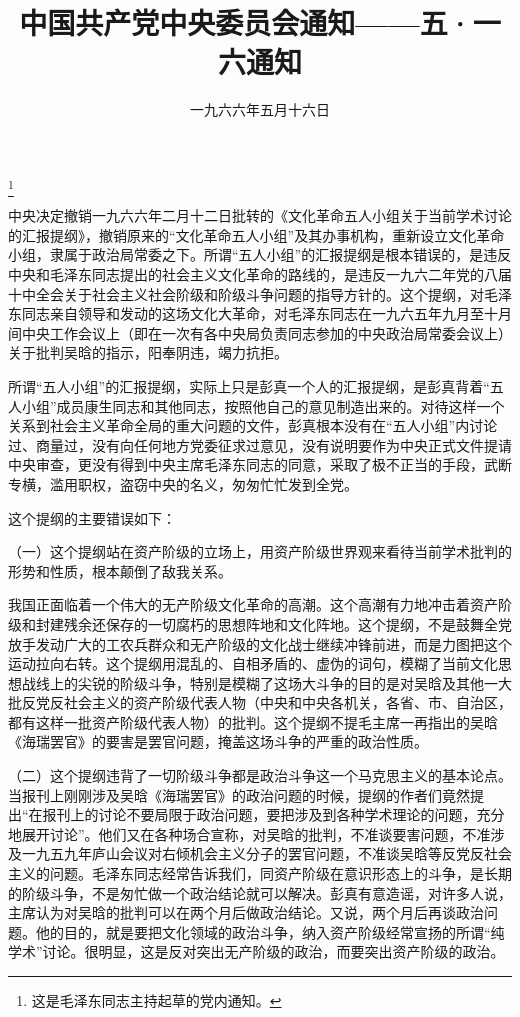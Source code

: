
\title{中国共产党中央委员会通知——五·一六通知}
\date{一九六六年五月十六日}
\thanks{这是毛泽东同志主持起草的党内通知。}
\maketitle



中央决定撤销一九六六年二月十二日批转的《文化革命五人小组关于当前学术讨论的汇报提纲》，撤销原来的“文化革命五人小组”及其办事机构，重新设立文化革命小组，隶属于政治局常委之下。所谓“五人小组”的汇报提纲是根本错误的，是违反中央和毛泽东同志提出的社会主义文化革命的路线的，是违反一九六二年党的八届十中全会关于社会主义社会阶级和阶级斗争问题的指导方针的。这个提纲，对毛泽东同志亲自领导和发动的这场文化大革命，对毛泽东同志在一九六五年九月至十月间中央工作会议上（即在一次有各中央局负责同志参加的中央政治局常委会议上）关于批判吴晗的指示，阳奉阴违，竭力抗拒。

所谓“五人小组”的汇报提纲，实际上只是彭真一个人的汇报提纲，是彭真背着“五人小组”成员康生同志和其他同志，按照他自己的意见制造出来的。对待这样一个关系到社会主义革命全局的重大问题的文件，彭真根本没有在“五人小组”内讨论过、商量过，没有向任何地方党委征求过意见，没有说明要作为中央正式文件提请中央审查，更没有得到中央主席毛泽东同志的同意，采取了极不正当的手段，武断专横，滥用职权，盗窃中央的名义，匆匆忙忙发到全党。

这个提纲的主要错误如下：

（一）这个提纲站在资产阶级的立场上，用资产阶级世界观来看待当前学术批判的形势和性质，根本颠倒了敌我关系。

我国正面临着一个伟大的无产阶级文化革命的高潮。这个高潮有力地冲击着资产阶级和封建残余还保存的一切腐朽的思想阵地和文化阵地。这个提纲，不是鼓舞全党放手发动广大的工农兵群众和无产阶级的文化战士继续冲锋前进，而是力图把这个运动拉向右转。这个提纲用混乱的、自相矛盾的、虚伪的词句，模糊了当前文化思想战线上的尖锐的阶级斗争，特别是模糊了这场大斗争的目的是对吴晗及其他一大批反党反社会主义的资产阶级代表人物（中央和中央各机关，各省、市、自治区，都有这样一批资产阶级代表人物）的批判。这个提纲不提毛主席一再指出的吴晗《海瑞罢官》的要害是罢官问题，掩盖这场斗争的严重的政治性质。

（二）这个提纲违背了一切阶级斗争都是政治斗争这一个马克思主义的基本论点。当报刊上刚刚涉及吴晗《海瑞罢官》的政治问题的时候，提纲的作者们竟然提出“在报刊上的讨论不要局限于政治问题，要把涉及到各种学术理论的问题，充分地展开讨论”。他们又在各种场合宣称，对吴晗的批判，不准谈要害问题，不准涉及一九五九年庐山会议对右倾机会主义分子的罢官问题，不准谈吴晗等反党反社会主义的问题。毛泽东同志经常告诉我们，同资产阶级在意识形态上的斗争，是长期的阶级斗争，不是匆忙做一个政治结论就可以解决。彭真有意造谣，对许多人说，主席认为对吴晗的批判可以在两个月后做政治结论。又说，两个月后再谈政治问题。他的目的，就是要把文化领域的政治斗争，纳入资产阶级经常宣扬的所谓“纯学术”讨论。很明显，这是反对突出无产阶级的政治，而要突出资产阶级的政治。

